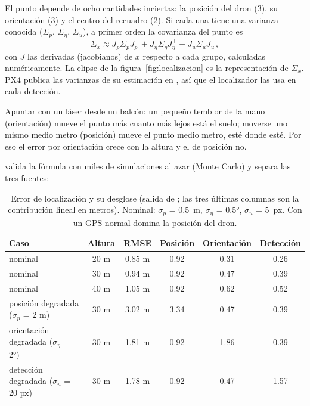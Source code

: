 El punto depende de ocho cantidades inciertas: la posición del dron (3), su orientación (3) y el
centro del recuadro (2). Si cada una tiene una varianza conocida ($\Sigma_p$, $\Sigma_\eta$, $\Sigma_u$),
a primer orden la covarianza del punto es
\begin{equation}
\Sigma_x \approx J_p\Sigma_pJ_p^\top + J_\eta\Sigma_\eta J_\eta^\top + J_u\Sigma_uJ_u^\top ,
\end{equation}
con $J$ las derivadas (jacobianos) de $x$ respecto a cada grupo, calculadas numéricamente. La elipse de
la figura~\ref{fig:localizacion} es la representación de $\Sigma_x$. PX4 publica las varianzas de su
estimación en , así que el localizador las usa en cada detección.

\begin{ejemplo}
Apuntar con un láser desde un balcón: un pequeño temblor de la mano (orientación) mueve el punto más
cuanto más lejos está el suelo; moverse uno mismo medio metro (posición) mueve el punto medio metro,
esté donde esté. Por eso el error por orientación crece con la altura y el de posición no.
\end{ejemplo}

 valida la fórmula con miles de simulaciones al azar (Monte Carlo) y
separa las tres fuentes:

\begin{table}[H]
\centering\small
\begin{tabular}{lccccc}
\toprule
\textbf{Caso} & \textbf{Altura} & \textbf{RMSE} & \textbf{Posición} & \textbf{Orientación} & \textbf{Detección} \\ \midrule
nominal & 20 m & 0.85 m & 0.92 & 0.31 & 0.26 \\
nominal & 30 m & 0.94 m & 0.92 & 0.47 & 0.39 \\
nominal & 40 m & 1.05 m & 0.92 & 0.62 & 0.52 \\
posición degradada ($\sigma_p$ = 2 m) & 30 m & 3.02 m & 3.34 & 0.47 & 0.39 \\
orientación degradada ($\sigma_\eta$ = 2°) & 30 m & 1.81 m & 0.92 & 1.86 & 0.39 \\
detección degradada ($\sigma_u$ = 20 px) & 30 m & 1.78 m & 0.92 & 0.47 & 1.57 \\
\bottomrule
\end{tabular}
\caption{Error de localización y su desglose (salida de ; las tres últimas
columnas son la contribución lineal en metros). Nominal: $\sigma_p$ = 0.5~m, $\sigma_\eta$ = 0.5°,
$\sigma_u$ = 5~px. Con un GPS normal domina la posición del dron.}
\end{table}

